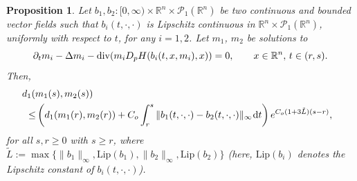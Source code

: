 \documentclass{amsart}
\newtheorem{prop}[thm]{Proposition}
\theoremstyle{remark}
\theoremstyle{definition}
\theoremstyle{Claim}
\newcommand{\dd}{\hspace{0.7pt}{\rm d}}
\theoremstyle{plain}
\begin{document}
\begin{prop}\label{propgen}
	Let $b_1,b_2:[0,\infty)\times \mathbb{R}^n\times \mathcal{P}_1(\mathbb{R}^n)$ be two continuous and bounded vector fields such that $b_i(t,\cdot,\cdot)$ is Lipschitz continuous in $\mathbb{R}^n\times \mathcal{P}_1(\mathbb{R}^n)$, uniformly with respect to $t$, for any $i=1,2$. Let $m_1$, $m_2$ be solutions to 
	\[
	\partial_t m_i-\Delta m_i-{\rm div}(m_iD_pH(b_i(t,x,m_i),x))=0,\qquad x\in \mathbb{R}^n,\,t\in (r,s).\\
	\]	
	Then, 
	\begin{equation}\label{casogenerale}
		\begin{split}
			&\hspace{-0.5cm}d_1(m_1(s), m_2(s))\\\le& \left(d_1(m_1(r), m_2(r)) +  C_o \int_r^s  \| b_1(t,\cdot,\cdot) - b_2(t,\cdot,\cdot) \|_\infty \dd t\right)e^{ C_o(1+3\tilde{L})(s-r)},
			\end{split}
	\end{equation}
	for all $s,r\geq 0$ with  $s\geq r$, where $\tilde{L}:=\max\{\lVert b_1\rVert_\infty,\text{Lip}(b_1),\lVert b_2\rVert_\infty,\text{Lip}(b_2)\}$ (here, $\text{Lip}(b_i)$ denotes the Lipschitz constant of $b_i(t,\cdot,\cdot)$).
\end{prop}
\end{document}
